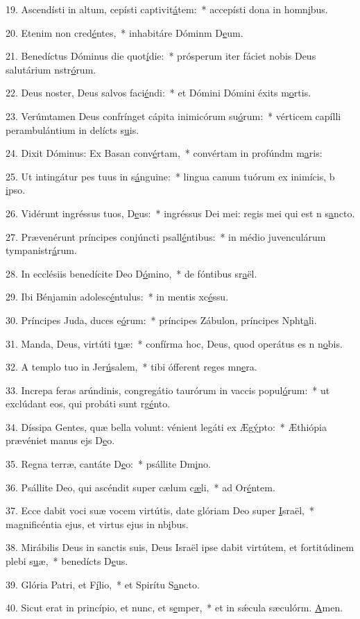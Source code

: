 19. Ascendísti in altum, cepísti captivit\uline{á}tem:~* accepísti dona in homn\uline{i}bus.\par 
20. Etenim non cred\uline{é}ntes,~* inhabitáre Dóminm D\uline{e}um.\par 
21. Benedíctus Dóminus die quot\uline{í}die:~* prósperum iter fáciet nobis Deus salutárium nstr\uline{ó}rum.\par 
22. Deus noster, Deus salvos faci\uline{é}ndi:~* et Dómini Dómini éxits m\uline{o}rtis.\par 
23. Verúmtamen Deus confrínget cápita inimicórum su\uline{ó}rum:~* vérticem capílli perambulántium in delícts s\uline{u}is.\par 
24. Dixit Dóminus: Ex Basan conv\uline{é}rtam,~* convértam in profúndm m\uline{a}ris:\par 
25. Ut intingátur pes tuus in s\uline{á}nguine:~* lingua canum tuórum ex inimícis, b \uline{i}pso.\par 
26. Vidérunt ingréssus tuos, D\uline{e}us:~* ingréssus Dei mei: regis mei qui est n s\uline{a}ncto.\par 
27. Prævenérunt príncipes conjúncti psall\uline{é}ntibus:~* in médio juvenculárum tympanistr\uline{á}rum.\par 
28. In ecclésiis benedícite Deo D\uline{ó}mino,~* de fóntibus sr\uline{a}ël.\par 
29. Ibi Bénjamin adolesc\uline{é}ntulus:~* in mentis xc\uline{é}ssu.\par 
30. Príncipes Juda, duces e\uline{ó}rum:~* príncipes Zábulon, príncipes Npht\uline{a}li.\par 
31. Manda, Deus, virtúti t\uline{u}æ:~* confírma hoc, Deus, quod operátus es n n\uline{o}bis.\par 
32. A templo tuo in Jer\uline{ú}salem,~* tibi ófferent reges mn\uline{e}ra.\par 
33. Increpa feras arúndinis, congregátio taurórum in vaccis popul\uline{ó}rum:~* ut exclúdant eos, qui probáti sunt rg\uline{é}nto.\par 
34. Díssipa Gentes, quæ bella volunt: vénient legáti ex Æg\uline{ý}pto:~* Æthiópia prævéniet manus ejs D\uline{e}o.\par 
35. Regna terræ, cantáte D\uline{e}o:~* psállite Dm\uline{i}no.\par 
36. Psállite Deo, qui ascéndit super cælum c\uline{æ}li,~* ad Or\uline{é}ntem.\par 
37. Ecce dabit voci suæ vocem virtútis, date glóriam Deo super \uline{I}sraël,~* magnificéntia ejus, et virtus ejus in nb\uline{i}bus.\par 
38. Mirábilis Deus in sanctis suis, Deus Israël ipse dabit virtútem, et fortitúdinem plebi s\uline{u}æ,~* benedícts D\uline{e}us.\par 
39. Glória Patri, et F\uline{í}lio,~* et Spirítu S\uline{a}ncto.\par 
40. Sicut erat in princípio, et nunc, et s\uline{e}mper,~* et in sǽcula sæculórm. \uline{A}men.\par 
